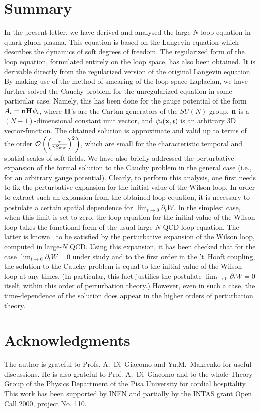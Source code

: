 \documentclass[a4paper,12pt]{article}
\begin{document}
\section{Summary}
In the present letter, we have derived and analysed the large-$N$ loop equation in quark-gluon plasma. This
equation is based on the Langevin equation which describes the dynamics of soft degrees of freedom. The regularized
form of the loop equation, formulated  entirely on the loop space, has also been obtained. It is derivable directly
from the regularized version of the original Langevin equation. By making use of the method of smearing of the loop-space Laplacian,
we have further solved the Cauchy problem for the unregularized equation in some particular case. Namely, this has been done for the
gauge potential of the form $A_i={\bf n}{\bf H}\psi_i$, where ${\bf H}$'s are the Cartan generators of the $SU(N)$-group,
${\bf n}$ is a $(N-1)$-dimensional constant unit vector, and $\psi_i({\bf x}, t)$ is an arbitrary 3D vector-function.
The obtained solution is approximate and valid up to terms of the order
${\cal O}\left(\left(\frac{\tau}{\gamma S_{\rm min}}\right)^2\right)$, which are small for the characteristic temporal and spatial scales of
soft fields. We have also briefly addressed the perturbative expansion of the formal solution to the Cauchy problem
in the general case (i.e., for an arbitrary gauge potential). Clearly, to perform this analysis, one first needs to fix
the perturbative expansion for the initial value of the Wilson loop. In order to extract such an expansion from the
obtained loop equation, it is necessary to postulate a certain spatial dependence for $\lim_{t\to 0}^{}\partial_tW$. In the simplest case,
when this limit is set to zero, the loop equation for the initial value of the Wilson loop takes the functional
form of the usual large-$N$ QCD loop equation. The latter is known~\cite{le, rev} to be satisfied by the
perturbative expansion of the Wilson loop, computed in large-$N$ QCD. Using this expansion, it has been checked that
for the case  $\lim_{t\to 0}^{}\partial_tW=0$ under study and to the first order in the
't~Hooft coupling, the solution to the Cauchy problem is equal to the initial value of the Wilson loop at any times.
(In particular, this fact justifies the postulate $\lim_{t\to 0}^{}\partial_tW=0$ itself, within this order of perturbation theory.)
However, even in such a case, the time-dependence of the solution does appear in the higher orders of perturbation theory.


\section*{Acknowledgments}
The author is grateful to Profs.
A.~Di~Giacomo and Yu.M.~Makeenko for
useful discussions. He is also grateful to Prof. A.~Di~Giacomo and to the
whole Theory Group of the Physics Department of the Pisa University
for cordial hospitality. This work has been supported by INFN and partially by the
INTAS grant Open Call 2000, project No. 110.
\end{document}
